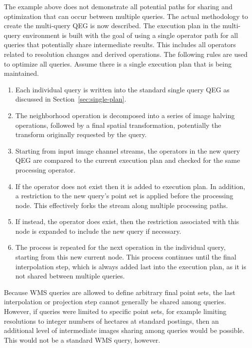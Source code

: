 \documentclass{ucdthesis}       %
\begin{document}
The example above does not demonstrate all potential paths for sharing
and optimization that can occur between multiple queries.  The actual
methodology to create the multi-query \ac{QEG} is now described.  The
execution plan in the multi-query environment is built with the goal
of using a single operator path for all queries that potentially share
intermediate results.  This includes all operators related to
resolution changes and derived operations.  The following rules are
used to optimize all queries.  Assume there is a single execution plan
that is being maintained.

\begin{enumerate}

\item Each individual query is written into the standard single query
  \ac{QEG} as discussed in Section~\ref{sec:single-plan}.

\item The neighborhood operation is decomposed into a series of
  image halving operations, followed by a final spatial
  transformation, potentially the transform originally requested by
  the query.

\item Starting from input image channel streams, the operators in the
  new query \ac{QEG} are compared to the current execution plan and
  checked for the same processing operator.

\item If the operator does not exist then it is added to execution
  plan.  In addition, a restriction to the new query's point set is
  applied before the processing node.  This effectively forks the
  stream along multiple processing paths.

\item If instead, the operator does exist, then the
  restriction associated with this node is expanded to include the new
  query if necessary.

\item The process is repeated for the next operation in the individual
  query, starting from this new current node.  This process continues
  until the final interpolation step, which is always added last into
  the execution plan, as it is not shared between multiple queries.

\end{enumerate}

Because \ac{WMS} queries are allowed to define arbitrary final point
sets, the last interpolation or projection step cannot generally be
shared among queries.  However, if queries were limited to specific
point sets, for example limiting resolutions to integer numbers of
hectares at standard postings, then an additional level of
intermediate images sharing among queries would be possible.  This
would not be a standard \ac{WMS} query, however.
\end{document}
